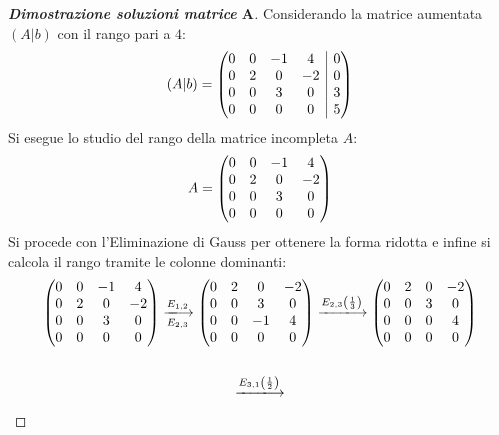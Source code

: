 \documentclass[a4paper]{article}
\makeatletter
\newenvironment{rowequmat}[1]{\left(\array{@{}#1@{}}}{\endarray\right)}
\makeatother
\begin{document}
	\noindent
	\begin{proof}[\textbf{Dimostrazione soluzioni matrice} $\boldsymbol{A}$]
		Considerando la matrice aumentata $\left(A|b\right)$ con il rango pari a $4$:
		\begin{equation*}
			\left(A|b\right) = \begin{rowequmat}{cccc|c}
				0 & 0 & -1 & 4 & 0 \\
				0 & 2 & 0 & -2 & 0 \\
				0 & 0 & 3 & 0 & 3 \\
				0 & 0 & 0 & 0 & 5
			\end{rowequmat}
		\end{equation*}
		Si esegue lo studio del rango della matrice incompleta $A$:
		\begin{equation*}
			A = \begin{rowequmat}{cccc}
				0 & 0 & -1 & 4 \\
				0 & 2 & 0 & -2 \\
				0 & 0 & 3 & 0 \\
				0 & 0 & 0 & 0
			\end{rowequmat}
		\end{equation*}
		Si procede con l'Eliminazione di Gauss per ottenere la forma ridotta e infine si calcola il rango tramite le colonne dominanti:
		\begin{gather*}
			\begin{rowequmat}{cccc}
				0 & 0 & -1 & 4 \\
				0 & 2 & 0 & -2 \\
				0 & 0 & 3 & 0 \\
				0 & 0 & 0 & 0
			\end{rowequmat} \xlongrightarrow[E_{2,3}]{E_{1,2}}
			\begin{rowequmat}{cccc}
				0 & 2 & 0 & -2 \\
				0 & 0 & 3 & 0 \\
				0 & 0 & -1 & 4 \\
				0 & 0 & 0 & 0
			\end{rowequmat}\xlongrightarrow{E_{2,3}\left(\frac{1}{3}\right)}
			\begin{rowequmat}{cccc}
				0 & 2 & 0 & -2 \\
				0 & 0 & 3 & 0 \\
				0 & 0 & 0 & 4 \\
				0 & 0 & 0 & 0
			\end{rowequmat} \\
			\\
			\xlongrightarrow{E_{3,1}\left(\frac{1}{2}\right)}

\end{gather*}
\end{proof}
\end{document}
